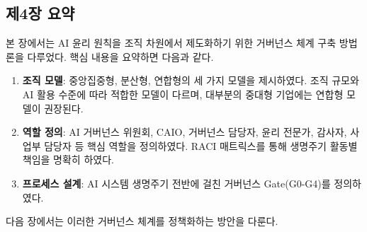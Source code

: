 \subsection*{제4장 요약}

본 장에서는 AI 윤리 원칙을 조직 차원에서 제도화하기 위한
거버넌스 체계 구축 방법론을 다루었다. 핵심 내용을 요약하면 다음과 같다.

\begin{enumerate}
 \item \textbf{조직 모델}: 
 중앙집중형, 분산형, 연합형의 세 가지 모델을 제시하였다. 
 조직 규모와 AI 활용 수준에 따라 적합한 모델이 다르며, 
 대부분의 중대형 기업에는 연합형 모델이 권장\cite{fountaine2019building}된다.
 
 \item \textbf{역할 정의}: 
 AI 거버넌스 위원회, CAIO, 거버넌스 담당자, 윤리 전문가, 감사자, 
 사업부 담당자 등 핵심 역할을 정의하였다. 
 RACI 매트릭스를 통해 생명주기 활동별 책임을 명확히 하였다.
 
 \item \textbf{프로세스 설계}: 
 AI 시스템 생명주기 전반에 걸친 거버넌스 Gate(G0-G4)를 정의하였다.
\end{enumerate}

다음 장에서는 이러한 거버넌스 체계를 정책화하는 방안을 다룬다.



